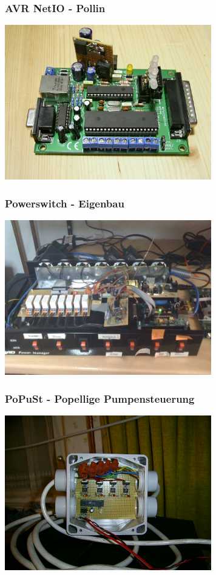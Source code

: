 \documentclass[utf8, xcolor=dvipsnames]{beamer}
\begin{document}
\begin{frame}
  \frametitle{AVR NetIO - Pollin}
  \begin{center}
    \includegraphics[width=9cm]{Avr-net-io.jpg}      
  \end{center}
\end{frame}

\begin{frame}
  \frametitle{Powerswitch - Eigenbau}
  \begin{center}
    \includegraphics[width=9cm]{Ethersex-Avrnet-GPA.jpg}      
  \end{center}
\end{frame}

\begin{frame}
  \frametitle{PoPuSt - Popellige Pumpensteuerung}
  \begin{center}
    \includegraphics[width=9cm]{TikiImage350.jpg}      
  \end{center}
\end{frame}
\end{document}

